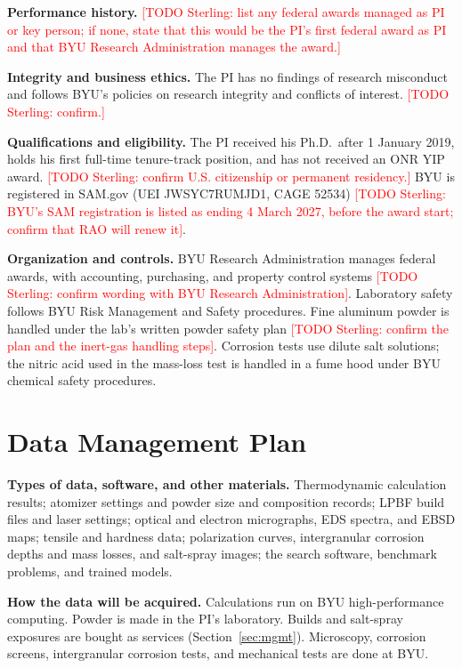 \documentclass[12pt,letterpaper]{article}
\newcommand{\todo}[1]{\textcolor{red}{[TODO Sterling: #1]}}
\begin{document}
\textbf{Performance history.} \todo{list any federal awards managed as PI or
key person; if none, state that this would be the PI's first federal award
as PI and that BYU Research Administration manages the award.}

\textbf{Integrity and business ethics.} The PI has no findings of research
misconduct and follows BYU's policies on research integrity and conflicts of
interest. \todo{confirm.}

\textbf{Qualifications and eligibility.} The PI received his Ph.D.\ after
1 January 2019, holds his first full-time tenure-track position, and has not
received an ONR YIP award. \todo{confirm U.S. citizenship or permanent
residency.} BYU is registered in SAM.gov (UEI JWSYC7RUMJD1, CAGE 52534)
\todo{BYU's SAM registration is listed as ending 4 March 2027, before the
award start; confirm that RAO will renew it}.

\textbf{Organization and controls.} BYU Research Administration manages
federal awards, with accounting, purchasing, and property control systems
\todo{confirm wording with BYU Research Administration}. Laboratory safety
follows BYU Risk Management and Safety procedures. Fine aluminum powder is
handled under the lab's written powder safety plan \todo{confirm the plan and
the inert-gas handling steps}. Corrosion tests use dilute salt solutions;
the nitric acid used in the mass-loss test is handled in a fume hood under
BYU chemical safety procedures.

\clearpage
\setcounter{page}{1}
\renewcommand{\thepage}{D-\arabic{page}}
\section{Data Management Plan}
\label{sec:dmp}

\textbf{Types of data, software, and other materials.} Thermodynamic
calculation results; atomizer settings and powder size and composition
records; LPBF build files and laser settings; optical and electron
micrographs, EDS spectra, and EBSD maps; tensile and hardness data;
polarization curves, intergranular corrosion depths and mass losses, and
salt-spray images; the search software, benchmark problems, and trained
models.

\textbf{How the data will be acquired.} Calculations run on BYU
high-performance computing. Powder is made in the PI's laboratory. Builds and
salt-spray exposures are bought as services
(Section~\ref{sec:mgmt}). Microscopy, corrosion screens, intergranular corrosion
tests, and mechanical tests are done at BYU.
\end{document}
